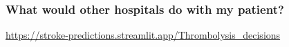 \begin{frame}
\frametitle{What would other hospitals do with my patient?}

\footnotesize
\url{https://stroke-predictions.streamlit.app/Thrombolysis_decisions}

\end{frame}